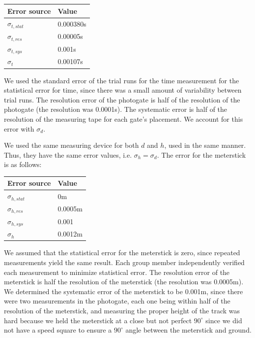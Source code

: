 \documentclass[12pt]{article}
\begin{document}
\begin{center}
\begin{tabular}{l|l}
\hline
Error source & Value\\
\hline
\(\sigma_{t,stat}\) & 0.000380s\\
\(\sigma_{t,res}\) & 0.00005s\\
\(\sigma_{t,sys}\) & 0.001s\\
\hline
\(\sigma_t\) & 0.00107s\\
\end{tabular}
\end{center}

We used the standard error of the trial runs for the time measurement for the statistical error for time, since there was a small amount of variability between trial runs. The resolution error of the photogate is half of the resolution of the photogate (the resolution was 0.0001s). The systematic error is half of the resolution of the measuring tape for each gate's placement. We account for this error with \(\sigma_d\).

We used the same measuring device for both \(d\) and \(h\), used in the same manner. Thus, they have the same error values, i.e. \(\sigma_h = \sigma_d\). The error for the meterstick is as follows:

\begin{center}
\begin{tabular}{l|l}
\hline
Error source & Value\\
\hline
\(\sigma_{h,stat}\) & 0m\\
\(\sigma_{h,res}\) & 0.0005m\\
\(\sigma_{h,sys}\) & 0.001\\
\hline
\(\sigma_h\) & 0.0012m\\
\end{tabular}
\end{center}

We assumed that the statistical error for the meterstick is zero, since repeated measurements yield the same result. Each group member independently verified each measurement to minimize statistical error. The resolution error of the meterstick is half the resolution of the meterstick (the resolution was 0.0005m). We determined the systematic error of the meterstick to be 0.001m, since there were two measurements in the photogate, each one being within half of the resolution of the meterstick, and measuring the proper height of the track was hard because we held the meterstick at a close but not perfect \(90^{\circ}\) since we did not have a speed square to ensure a \(90^{\circ}\) angle between the meterstick and ground.
\end{document}
